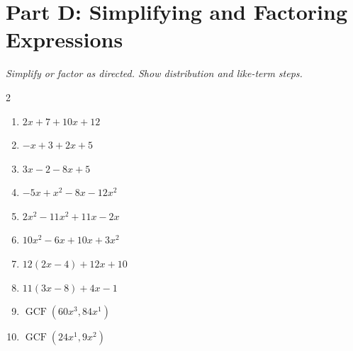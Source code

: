 \documentclass[11pt]{article}
\begin{document}
\section*{Part D: Simplifying and Factoring Expressions}
\noindent\textit{Simplify or factor as directed. Show distribution and like-term steps.}
\begin{multicols}{2}
\begin{enumerate}
  \item $2x + 7 + 10x + 12$
  \vspace{1.3cm}
  \item $-x + 3 + 2x + 5$
  \vspace{1.3cm}
  \item $3x - 2 - 8x + 5$
  \vspace{1.3cm}
  \item $-5x + x^{2} - 8x - 12x^{2}$
  \vspace{1.3cm}
  \item $2x^{2} - 11x^{2} + 11x - 2x$
  \vspace{1.3cm}
  \item $10x^{2} - 6x + 10x + 3x^{2}$
  \vspace{1.3cm}
  \item $12(2x - 4) + 12x + 10$
  \vspace{1.3cm}
  \item $11(3x - 8) + 4x - 1$
  \vspace{1.3cm}
  \item $\operatorname{GCF}\left(60x^{3}, 84x^{1}\right)$
  \vspace{1.3cm}
  \item $\operatorname{GCF}\left(24x^{1}, 9x^{2}\right)$
  \vspace{1.3cm}
\end{enumerate}
\end{multicols}
\end{document}

